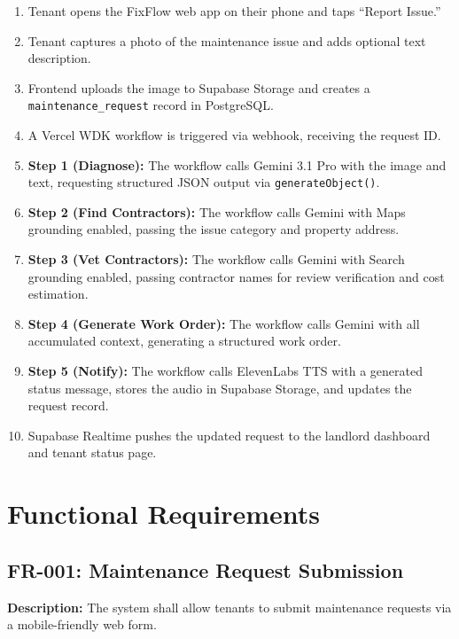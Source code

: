 \documentclass[12pt,a4paper]{article}
\begin{document}
\begin{enumerate}
    \item Tenant opens the FixFlow web app on their phone and taps ``Report Issue.''
    \item Tenant captures a photo of the maintenance issue and adds optional text description.
    \item Frontend uploads the image to Supabase Storage and creates a \texttt{maintenance\_request} record in PostgreSQL.
    \item A Vercel WDK workflow is triggered via webhook, receiving the request ID.
    \item \textbf{Step 1 (Diagnose):} The workflow calls Gemini 3.1 Pro with the image and text, requesting structured JSON output via \texttt{generateObject()}.
    \item \textbf{Step 2 (Find Contractors):} The workflow calls Gemini with Maps grounding enabled, passing the issue category and property address.
    \item \textbf{Step 3 (Vet Contractors):} The workflow calls Gemini with Search grounding enabled, passing contractor names for review verification and cost estimation.
    \item \textbf{Step 4 (Generate Work Order):} The workflow calls Gemini with all accumulated context, generating a structured work order.
    \item \textbf{Step 5 (Notify):} The workflow calls ElevenLabs TTS with a generated status message, stores the audio in Supabase Storage, and updates the request record.
    \item Supabase Realtime pushes the updated request to the landlord dashboard and tenant status page.
\end{enumerate}

\section{Functional Requirements}

\subsection{FR-001: Maintenance Request Submission}

\textbf{Description:} The system shall allow tenants to submit maintenance requests via a mobile-friendly web form.
\end{document}
